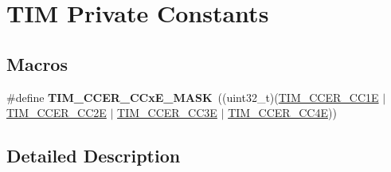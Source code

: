 \hypertarget{group___t_i_m___private___constants}{\section{T\-I\-M Private Constants}
\label{group___t_i_m___private___constants}
}
\subsection*{Macros}
\begin{DoxyCompactItemize}
\item 
\hypertarget{group___t_i_m___private___constants_ga5d1a1d755cda12637dfa5143130b4891}{\#define {\bfseries T\-I\-M\-\_\-\-C\-C\-E\-R\-\_\-\-C\-Cx\-E\-\_\-\-M\-A\-S\-K}~((uint32\-\_\-t)(\hyperlink{group___peripheral___registers___bits___definition_ga3f494b9881e7b97bb2d79f7ad4e79937}{T\-I\-M\-\_\-\-C\-C\-E\-R\-\_\-\-C\-C1\-E} $\vert$ \hyperlink{group___peripheral___registers___bits___definition_ga76392a4d63674cd0db0a55762458f16c}{T\-I\-M\-\_\-\-C\-C\-E\-R\-\_\-\-C\-C2\-E} $\vert$ \hyperlink{group___peripheral___registers___bits___definition_ga1da114e666b61f09cf25f50cdaa7f81f}{T\-I\-M\-\_\-\-C\-C\-E\-R\-\_\-\-C\-C3\-E} $\vert$ \hyperlink{group___peripheral___registers___bits___definition_ga940b041ab5975311f42f26d314a4b621}{T\-I\-M\-\_\-\-C\-C\-E\-R\-\_\-\-C\-C4\-E}))}\label{group___t_i_m___private___constants_ga5d1a1d755cda12637dfa5143130b4891}

\end{DoxyCompactItemize}


\subsection{Detailed Description}
